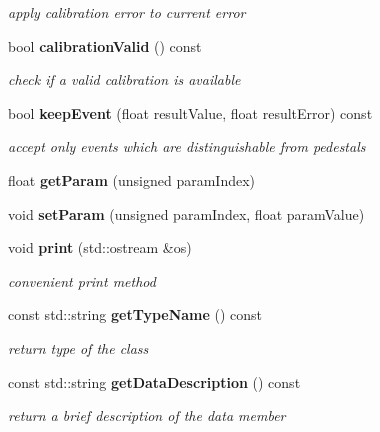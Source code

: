\begin{DoxyCompactItemize}
\begin{DoxyCompactList}\small\item\em apply calibration error to current error \end{DoxyCompactList}\item 
bool {\bf calibration\-Valid} () const \label{classCALICE_1_1PedestalConstants_a6cfd6a82fa83433d2abe95b830ae164d}

\begin{DoxyCompactList}\small\item\em check if a valid calibration is available \end{DoxyCompactList}\item 
bool {\bf keep\-Event} (float result\-Value, float result\-Error) const \label{classCALICE_1_1PedestalConstants_a5296ca6178fa8cebd290bcae2f39a86f}

\begin{DoxyCompactList}\small\item\em accept only events which are distinguishable from pedestals \end{DoxyCompactList}\item 
float {\bfseries get\-Param} (unsigned param\-Index)\label{classCALICE_1_1PedestalConstants_ad432e4fbd1c354798b37fa5fc609825a}

\item 
void {\bfseries set\-Param} (unsigned param\-Index, float param\-Value)\label{classCALICE_1_1PedestalConstants_aff69422b46746ad27d06cec76dbfa3a6}

\item 
void {\bf print} (std\-::ostream \&os)\label{classCALICE_1_1PedestalConstants_a312e7cf9898d2b6540d0db552fa02416}

\begin{DoxyCompactList}\small\item\em convenient print method \end{DoxyCompactList}\item 
const std\-::string {\bf get\-Type\-Name} () const \label{classCALICE_1_1PedestalConstants_acdb7efb3b0197ff4881912b625b704c0}

\begin{DoxyCompactList}\small\item\em return type of the class \end{DoxyCompactList}\item 
const std\-::string {\bf get\-Data\-Description} () const \label{classCALICE_1_1PedestalConstants_a974f370dddb3b7989563874a0eb5e8a9}

\begin{DoxyCompactList}\small\item\em return a brief description of the data member \end{DoxyCompactList}\end{DoxyCompactItemize}
